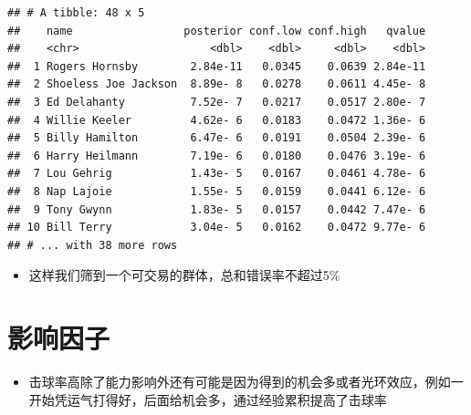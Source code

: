 \documentclass[]{book}
\newenvironment{Shaded}{\begin{snugshade}}{\end{snugshade}}
\newcommand{\CommentTok}[1]{\textcolor[rgb]{0.56,0.35,0.01}{\textit{#1}}}
\newcommand{\DataTypeTok}[1]{\textcolor[rgb]{0.13,0.29,0.53}{#1}}
\newcommand{\FloatTok}[1]{\textcolor[rgb]{0.00,0.00,0.81}{#1}}
\newcommand{\KeywordTok}[1]{\textcolor[rgb]{0.13,0.29,0.53}{\textbf{#1}}}
\newcommand{\NormalTok}[1]{#1}
\newcommand{\OperatorTok}[1]{\textcolor[rgb]{0.81,0.36,0.00}{\textbf{#1}}}
\newcommand{\StringTok}[1]{\textcolor[rgb]{0.31,0.60,0.02}{#1}}
\providecommand{\tightlist}{%
  \setlength{\itemsep}{0pt}\setlength{\parskip}{0pt}}
\begin{document}
\begin{Shaded}
\end{Shaded}

\begin{verbatim}
## # A tibble: 48 x 5
##    name                 posterior conf.low conf.high   qvalue
##    <chr>                    <dbl>    <dbl>     <dbl>    <dbl>
##  1 Rogers Hornsby        2.84e-11   0.0345    0.0639 2.84e-11
##  2 Shoeless Joe Jackson  8.89e- 8   0.0278    0.0611 4.45e- 8
##  3 Ed Delahanty          7.52e- 7   0.0217    0.0517 2.80e- 7
##  4 Willie Keeler         4.62e- 6   0.0183    0.0472 1.36e- 6
##  5 Billy Hamilton        6.47e- 6   0.0191    0.0504 2.39e- 6
##  6 Harry Heilmann        7.19e- 6   0.0180    0.0476 3.19e- 6
##  7 Lou Gehrig            1.43e- 5   0.0167    0.0461 4.78e- 6
##  8 Nap Lajoie            1.55e- 5   0.0159    0.0441 6.12e- 6
##  9 Tony Gwynn            1.83e- 5   0.0157    0.0442 7.47e- 6
## 10 Bill Terry            3.04e- 5   0.0162    0.0472 9.77e- 6
## # ... with 38 more rows
\end{verbatim}

\begin{itemize}
\tightlist
\item
  这样我们筛到一个可交易的群体，总和错误率不超过5\%
\end{itemize}

\hypertarget{ux5f71ux54cdux56e0ux5b50}{%
\section{影响因子}\label{ux5f71ux54cdux56e0ux5b50}}

\begin{itemize}
\tightlist
\item
  击球率高除了能力影响外还有可能是因为得到的机会多或者光环效应，例如一开始凭运气打得好，后面给机会多，通过经验累积提高了击球率
\end{itemize}
\end{document}
